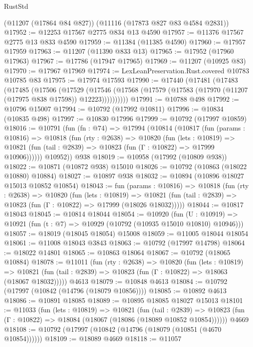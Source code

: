 \begin{lexlean}{RustStd}
\begin{coremodule}
    (@11207 (@17864 @84 @827))
    (@11116 (@17873 @827 @83 @4584 @2831))
@17952 := @12253 @17567 @2775 @834 @13 @4590
@17957 := @11376 @17567 @2775 @13 @833 @4590
@17959 := @11384 (@11385 @4590)
@17960 := @17957 @17959
@17963 := @11207 (@11390 @833 @13)
@17965 := @17952 (@17960 @17963)
@17967 := @17786 (@17947 @17965)
@17969 := @11207 (@10925 @83)
@17970 := @17967 @17969
@17974 := LexLeanPreservation.Rust.covered @10783 @10785 @83
@17975 := @17974 @17593
@17990 := @17440
    (@17481
      (@17483
        (@17485
          (@17506
            (@17529
              (@17546 (@17568 (@17579 (@17583 (@17970 (@11207 (@17975 @838 @17598)) @12223))))))))))
@17991 := @10788 @498
@17992 := @10796 @15007
@17994 := @10792 (@17992 @10811)
@17996 := @10834 (@10835 @498)
@17997 := @10830 @17996
@17999 := @10792 (@17997 @10859)
@18016 := @10791
    (fun (fn : @74) =>
    @17994
      (@10814
        (@10817
          (fun (params : @10816) =>
          @10818
            (fun (rty : @2638) =>
            @10820
              (fun (lets : @10819) =>
              @10821 (fun (tail : @2839) => @10823 (fun (Γ : @10822) => @17999 @10906))))))
        @10952))
    @938
@18019 := @10958 (@17992 (@10809 @938))
@18022 := @10871 (@10872 @938) @15010
@18026 := @10792 (@10863 (@18022 @10880) @10884)
@18027 := @10897 @938
@18032 := @10894 (@10896 @18027 @15013 @10852 @10854)
@18043 := fun (params : @10816) =>
  @10818
    (fun (rty : @2638) =>
    @10820
      (fun (lets : @10819) =>
      @10821 (fun (tail : @2839) => @10823 (fun (Γ : @10822) => @17999 (@18026 @18032)))))
@18044 := @10817 @18043
@18045 := @10814 @18044
@18054 := @10920
    (fun (U : @10919) => @10921 (fun (t : @7) => @10929 (@10792 (@10935 @15010 @10810) @10946)))
@18057 := @18019 (@18045 @18054) @15008
@18059 := @11005 @18044 @18054
@18061 := @11008 @18043 @3843
@18063 := @10792 (@17997 @14798)
@18064 := @18022 @14801
@18065 := @10863 @18064
@18067 := @10792 (@18065 @10884)
@18078 := @11011
    (fun (rty : @2638) =>
    @10820
      (fun (lets : @10819) =>
      @10821 (fun (tail : @2839) => @10823 (fun (Γ : @10822) => @18063 (@18067 @18032)))))
    @4613
@18079 := @10848 @4613
@18084 := @10792 (@17997 (@10842 (@14796 (@18079 @10856))))
@18085 := @10892 @4613
@18086 := @10891 @18085
@18089 := @10895 @18085 @18027 @15013
@18101 := @11033
    (fun (lets : @10819) =>
    @10821
      (fun (tail : @2839) =>
      @10823 (fun (Γ : @10822) => @18084 (@18067 (@18086 (@18089 @10852 @10854))))))
    @4669
@18108 := @10792 (@17997 (@10842 (@14796 (@18079 (@10851 (@4670 @10854))))))
@18109 := @18089 @4669
@18118 := @11057

\end{coremodule}
\end{lexlean}
